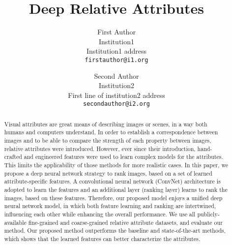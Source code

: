 \documentclass[10pt,twocolumn,letterpaper]{article}
\begin{document}
\title{Deep Relative Attributes}

\author{First Author\\
Institution1\\
Institution1 address\\
{\tt\small firstauthor@i1.org}
\and
Second Author\\
Institution2\\
First line of institution2 address\\
{\tt\small secondauthor@i2.org}
}

\maketitle

\begin{abstract}
Visual attributes are great means of describing images or scenes, in a way both humans and computers understand. In order to establish a correspondence between images and to be able to compare the strength of each property between images, relative attributes were introduced. However, ever since their introduction, hand-crafted and engineered features were used to learn complex models for the attributes. This limits the applicability of those methods for more realistic cases. In this paper, we propose a deep neural network strategy to rank images, based on a set of learned attribute-specific features. A convolutional neural network (ConvNet) architecture is adopted to learn the features and an additional layer (ranking layer) learns to rank the images, based on these features. Therefore, our proposed model enjoys a unified deep neural network model, in which both feature learning and ranking are intertwined, influencing each other while enhancing the overall performance. We use all publicly-available fine-grained and coarse-grained relative attribute datasets, and evaluate our method. Our proposed method outperforms the baseline and state-of-the-art methods, which shows that the learned features can better characterize the attributes.
\end{abstract}








{\small


}
\end{document}
